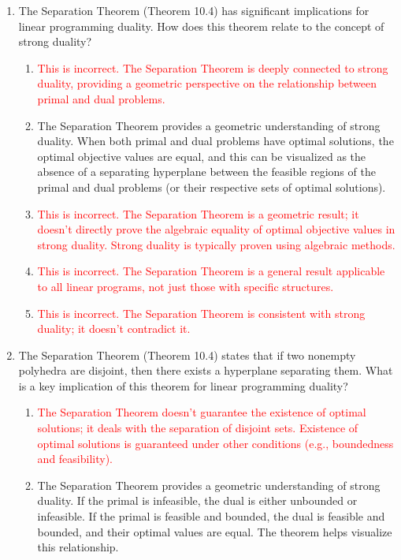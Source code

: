 \documentclass{article}%
\newcommand{\incorrect}[1]{\textcolor{red}{#1}}
\begin{document}
\begin{enumerate}
\begin{enumerate}
\end{enumerate}%
\vspace{1em}%
\item The Separation Theorem (Theorem 10.4) has significant implications for linear programming duality.  How does this theorem relate to the concept of strong duality?%
\begin{enumerate}%
\item \incorrect{This is incorrect. The Separation Theorem is deeply connected to strong duality, providing a geometric perspective on the relationship between primal and dual problems.}%
\item The Separation Theorem provides a geometric understanding of strong duality.  When both primal and dual problems have optimal solutions, the optimal objective values are equal, and this can be visualized as the absence of a separating hyperplane between the feasible regions of the primal and dual problems (or their respective sets of optimal solutions).%
\item \incorrect{This is incorrect. The Separation Theorem is a geometric result; it doesn't directly prove the algebraic equality of optimal objective values in strong duality.  Strong duality is typically proven using algebraic methods.}%
\item \incorrect{This is incorrect. The Separation Theorem is a general result applicable to all linear programs, not just those with specific structures.}%
\item \incorrect{This is incorrect. The Separation Theorem is consistent with strong duality; it doesn't contradict it.}%
\end{enumerate}%
\vspace{1em}%
\item The Separation Theorem (Theorem 10.4) states that if two nonempty polyhedra are disjoint, then there exists a hyperplane separating them.  What is a key implication of this theorem for linear programming duality?%
\begin{enumerate}%
\item \incorrect{The Separation Theorem doesn't guarantee the existence of optimal solutions; it deals with the separation of disjoint sets.  Existence of optimal solutions is guaranteed under other conditions (e.g., boundedness and feasibility).}%
\item The Separation Theorem provides a geometric understanding of strong duality. If the primal is infeasible, the dual is either unbounded or infeasible.  If the primal is feasible and bounded, the dual is feasible and bounded, and their optimal values are equal. The theorem helps visualize this relationship.%

\end{enumerate}
\end{enumerate}
\end{document}

